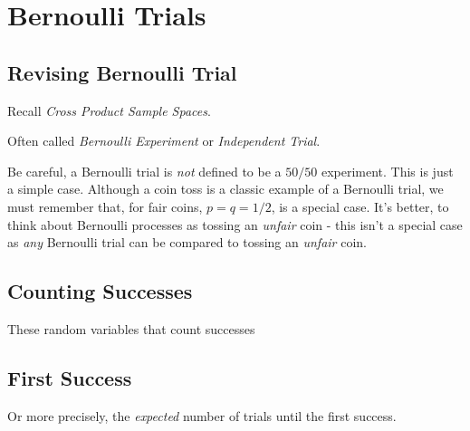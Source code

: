 
\chapter{Bernoulli Trials}



\section{Revising Bernoulli Trial}


Recall \textit{Cross Product Sample Spaces}.

Often called \textit{Bernoulli Experiment} or \textit{Independent Trial}. 


Be careful, a Bernoulli trial is \textit{not} defined to be a
$50/50$ experiment. This is just a simple case. 
Although a coin toss is a classic example of a Bernoulli trial,
we must remember that, for fair coins, $p = q = 1/2$, 
is a special case. It's better, to think about 
Bernoulli processes as tossing an \textit{unfair} coin - this 
isn't a special case as \textit{any} Bernoulli trial can be 
compared to tossing an \textit{unfair} coin.






\section{Counting Successes}




These random variables that count successes


\section{First Success}





Or more precisely, the \textit{expected} number of trials until the first success.

